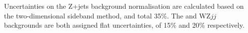 Uncertainties on the Z+jets background normalisation are calculated based on the
two-dimensional sideband method, and total 35\%. The \tty and WZ$jj$ backgrounds
are both assigned flat uncertainties, of 15\% and 20\% respectively.
